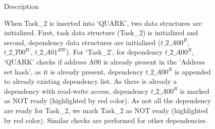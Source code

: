 \documentclass{article}
\begin{document}
\begin{figure}
\begin{minipage}{1.0\linewidth}
Description

When Task\_2 is inserted into `QUARK', two data structures are initialized. First, task data structure (Task\_2) is initialized and second, dependency data structures are initialized ($t\_2\_A00^{R}$, $t\_2\_T00^{W}$, $t\_2\_A01^{RW}$). For `Task\_2', for dependency $t\_2\_A00^{R}$, `QUARK' checks if address A00 is already present in the 'Address set hash', as it is already present, dependency $t\_2\_A00^{R}$ is appended to already existing dependency list. As there is already a dependency with read-write access, dependency $t\_2\_A00^{R}$ is marked as NOT ready (highlighted by red color). As not all the dependency are ready for Task\_2, we mark Task\_2 as NOT ready (highlighted by red color). Similar checks are performed for other dependencies.
\begin{verbatim}









\end{verbatim}

\end{minipage}

\end{figure}
\end{document}
